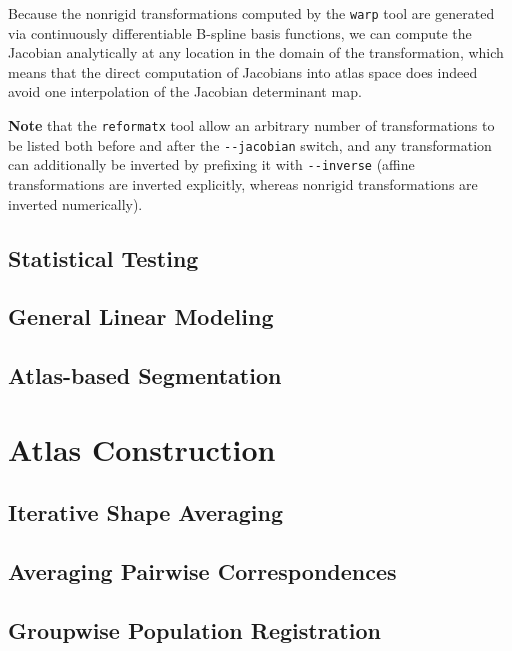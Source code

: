 \documentclass{InsightArticle}
\begin{document}
Because the nonrigid transformations computed by the \verb|warp| tool are
generated via continuously differentiable B-spline basis functions, we can
compute the Jacobian analytically at any location in the domain of the
transformation, which means that the direct computation of Jacobians into
atlas space does indeed avoid one interpolation of the Jacobian determinant
map.

{\bf Note} that the \verb|reformatx| tool allow an arbitrary number of
transformations to be listed both before and after the \verb|--jacobian|
switch, and any transformation can additionally be inverted by prefixing it
with \verb|--inverse| (affine transformations are inverted explicitly, whereas
nonrigid transformations are inverted numerically). 

\subsection{Statistical Testing}

\subsection{General Linear Modeling}

\subsection{Atlas-based Segmentation}

\section{Atlas Construction}

\subsection{Iterative Shape Averaging}

\cite{RohlBranMaur:2001}
\cite{KuryRohlKrof:2008,BranRohlRyba:2005}

\subsection{Averaging Pairwise Correspondences}

\cite{GuimMeunThir:2000}

\subsection{Groupwise Population Registration}
\end{document}
